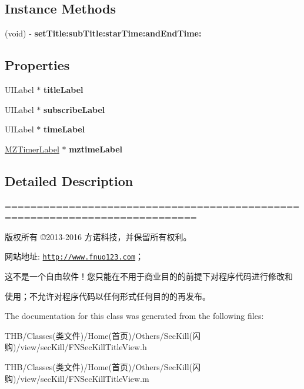 \subsection*{Instance Methods}
\begin{DoxyCompactItemize}
\item 
\mbox{\label{interface_f_n_sec_kill_title_view_a58d7b9adf5c7f98bddd591646eb2f0e5}} 
(void) -\/ {\bfseries set\+Title\+:sub\+Title\+:star\+Time\+:and\+End\+Time\+:}
\end{DoxyCompactItemize}
\subsection*{Properties}
\begin{DoxyCompactItemize}
\item 
\mbox{\label{interface_f_n_sec_kill_title_view_a25101206349a37afbe003adcd2cb580d}} 
U\+I\+Label $\ast$ {\bfseries title\+Label}
\item 
\mbox{\label{interface_f_n_sec_kill_title_view_a2f65ff6eb761b16c60f96483326e511a}} 
U\+I\+Label $\ast$ {\bfseries subscribe\+Label}
\item 
\mbox{\label{interface_f_n_sec_kill_title_view_ad63683d51c5ecbc9b9fd58388aca415c}} 
U\+I\+Label $\ast$ {\bfseries time\+Label}
\item 
\mbox{\label{interface_f_n_sec_kill_title_view_ab674a9027eaf50af1bdbf6f1c255c8e7}} 
\mbox{\hyperlink{interface_m_z_timer_label}{M\+Z\+Timer\+Label}} $\ast$ {\bfseries mztime\+Label}
\end{DoxyCompactItemize}


\subsection{Detailed Description}
============================================================================

版权所有 ©2013-\/2016 方诺科技，并保留所有权利。

网站地址\+: \href{http://www.fnuo123.com}{\tt http\+://www.\+fnuo123.\+com}； 



这不是一个自由软件！您只能在不用于商业目的的前提下对程序代码进行修改和

使用；不允许对程序代码以任何形式任何目的的再发布。 

 

The documentation for this class was generated from the following files\+:\begin{DoxyCompactItemize}
\item 
T\+H\+B/\+Classes(类文件)/\+Home(首页)/\+Others/\+Sec\+Kill(闪购)/view/sec\+Kill/F\+N\+Sec\+Kill\+Title\+View.\+h\item 
T\+H\+B/\+Classes(类文件)/\+Home(首页)/\+Others/\+Sec\+Kill(闪购)/view/sec\+Kill/F\+N\+Sec\+Kill\+Title\+View.\+m\end{DoxyCompactItemize}
